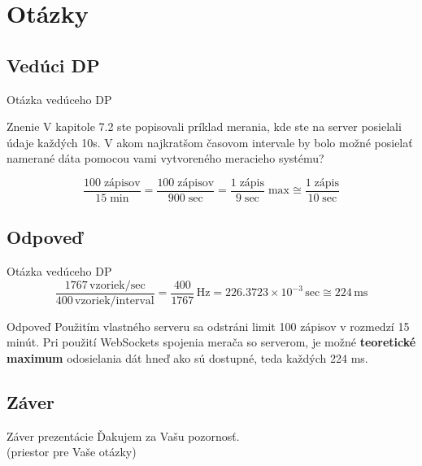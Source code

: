 \documentclass[hyperref={unicode}]{beamer}
\begin{document}
\section{Otázky}
\label{sec:Otázky}

\subsection{Vedúci DP}
\label{sub:Vedúci}

\begin{frame}{Otázka vedúceho DP}
	\begin{block}{Znenie}
		V kapitole 7.2 ste popisovali príklad merania, kde ste na server posielali údaje každých 10s. V akom najkratšom časovom intervale by bolo možné posielať namerané dáta pomocou vami vytvoreného meracieho systému?
	\end{block}

	\begin{equation*}
		\frac{100\;\text{zápisov}}{15\;\text{min}} = \frac{100\;\text{zápisov}}{900\;\text{sec}} = \frac{1\;\text{zápis}}{9\;\text{sec}}\;\text{max} \cong \frac{1\;\text{zápis}}{10\;\text{sec}}
	\end{equation*}
\end{frame}



\subsection{Odpoveď}
\label{sub:Odpoveď}

\begin{frame}{Otázka vedúceho DP}
	\begin{equation*}
		\frac{1767\,\text{vzoriek/sec}}{400\,\text{vzoriek/interval}} = \frac{400}{1767}\,\text{Hz} = 226.3723\times 10^{-3}\,\text{sec}\cong 224\,\text{ms}
	\end{equation*}

	\begin{block}{Odpoveď}
		Použitím vlastného serveru sa odstráni limit 100 zápisov v rozmedzí 15 minút. Pri použití WebSockets spojenia merača so serverom, je možné \textbf{teoretické maximum} odosielania dát hneď ako sú dostupné, teda každých 224 ms.
	\end{block}
\end{frame}



\subsection{Záver}
\label{sub:Záver}

\begin{frame}{Záver prezentácie}
	\centering
	{\Large Ďakujem za Vašu pozornosť.\\
	\vspace{1cm}
	(priestor pre Vaše otázky)}
\end{frame}
\end{document}
